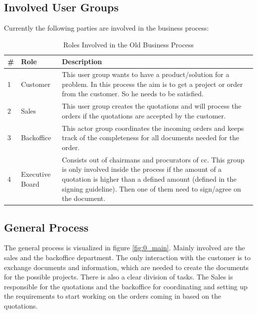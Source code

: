 \subsection*{Involved User Groups}
Currently the following parties are involved in the business process: 
\begin{table}[h]
	\begin{tabular}{|p{0.25cm}|p{2cm}|p{13cm}|} \hline
		\rowcolor{Gray}\# & Role & Description \\ \hline
		1 & Customer & This user group wants to have a product/solution for a problem. In this process the aim is to get a project or order from the customer. So he needs to be satisfied. \\ \hline
		2 & Sales & This user group creates the quotations and will process the orders if the quotations are accepted by the customer. \\ \hline
		3 & Backoffice & This actor group coordinates the incoming orders and keeps track of the completeness for all documents needed for the order. \\ \hline
		4 & Executive Board & Consists out of chairmans and procurators of \gls{cc}. This group is only involved inside the process if the amount of a quotation is higher than a defined amount (defined in the signing guideline). Then one of them need to sign/agree on the document. \\ \hline
	\end{tabular}
	\caption{Roles Involved in the Old Business Process}
	\label{tab:bpRoles}
\end{table}

\subsection*{General Process}
The general process is visualized in figure \ref{fig:0_main}. Mainly involved are the sales and the backoffice department. The only interaction with the customer is to exchange documents and information, which are needed to create the documents for the possible projects. There is also a clear division of tasks. The Sales is responsible for the quotations and the backoffice for coordinating and setting up the requirements to start working on the orders coming in based on the quotations.

